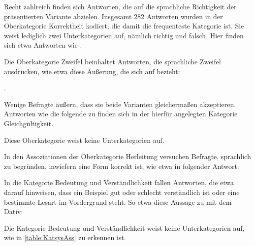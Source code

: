 Recht zahlreich finden sich Antworten, die auf die sprachliche Richtigkeit der präsentierten Variante abzielen. 
Insgesamt 282 Antworten wurden in der Oberkategorie \glqq Korrektheit\grqq{} kodiert, die damit die frequenteste Kategorie ist. 
Sie weist lediglich zwei Unterkategorien auf, nämlich \glqq richtig\grqq{} und \glqq falsch\grqq. 
Hier finden sich etwa Antworten wie . 

Die Oberkategorie \glqq Zweifel\grqq{} beinhaltet Antworten, die sprachliche Zweifel ausdrücken, wie etwa diese Äußerung, die sich auf \gegenueber{} bezieht: 
\begin{exe}
\ex {}. 
\end{exe}
Wenige Befragte äußern, dass sie beide Varianten gleichermaßen akzeptieren. 
Antworten wie die folgende zu \dank{} finden sich in der hierfür angelegten Kategorie \glqq Gleichgültigkeit\grqq.
\begin{exe}
\ex {}
\end{exe}
Diese Oberkategorie weist keine Unterkategorien auf.

In den Assoziationen der Oberkategorie \glqq Herleitung\grqq{} versuchen Befragte, sprachlich zu begründen, inwiefern eine Form korrekt ist, wie etwa in folgender Antwort: 
\begin{exe}
\ex {}
\end{exe}

In die Kategorie \glqq Bedeutung und Verständlichkeit\grqq{} fallen Antworten, die etwa darauf hinweisen, dass ein Beispiel gut oder schlecht verständlich ist oder eine bestimmte Lesart im Vordergrund steht. 
So etwa diese Aussage zu \gegenueber{} mit dem Dativ: 
\begin{exe}
\ex {}
\end{exe}
Die Kategorie \glqq Bedeutung und Verständlichkeit\grqq{} weist keine Unterkategorien auf, wie in \autoref{table:KatsysAss} zu erkennen ist.
 
